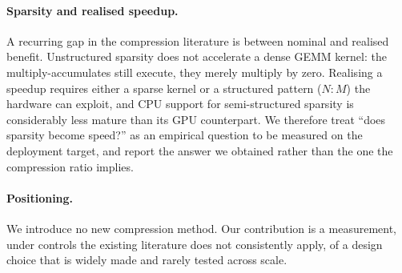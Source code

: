 \paragraph{Sparsity and realised speedup.} A recurring gap in the compression literature is
between nominal and realised benefit. Unstructured sparsity does not accelerate a dense GEMM
kernel: the multiply-accumulates still execute, they merely multiply by zero. Realising a
speedup requires either a sparse kernel or a structured pattern ($N{:}M$) the hardware can
exploit, and CPU support for semi-structured sparsity is considerably less mature than its
GPU counterpart. We therefore treat ``does sparsity become speed?'' as an empirical question
to be measured on the deployment target, and report the answer we obtained rather than the
one the compression ratio implies.

\paragraph{Positioning.} We introduce no new compression method. Our contribution is a
measurement, under controls the existing literature does not consistently apply, of a design
choice that is widely made and rarely tested across scale.
